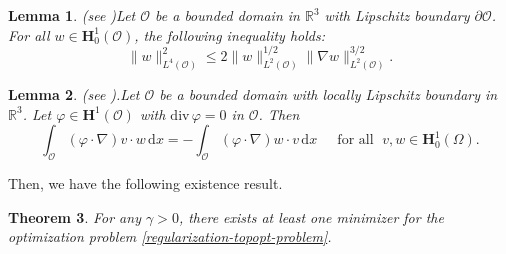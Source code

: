 \documentclass[a4paper,12pt,reqno,natbib]{amsart}
\newtheorem{theorem}{Theorem}
\newtheorem{lemma}[theorem]{Lemma}
\newcommand{\dx} {\displaystyle\mathrm{d}x}
\def\O{\mathcal O}
\def\H{\textbf{H}}
\begin{document}
\begin{lemma}(see \cite[Lemma 3.5, p. 237]{temam1973theory})\label{estimat-L-4} Let $\mathcal{O}$ be a bounded domain in \( \mathbb{R}^3 \) with Lipschitz boundary $\partial\O$. For all $w\in\H^1_0(\mathcal{O})$, the following inequality holds:
    \begin{equation*}
        \big\|w \big\|_{L^4(\mathcal{O})}^2\leq 2 \big\|w \big\|_{L^2(\mathcal{O})}^{1/2}\big\|\nabla w \big\|_{L^2(\mathcal{O})}^{3/2}.
    \end{equation*}
\end{lemma}

\begin{lemma} (see  \cite[ Lemma IX.2.1, p. 591]{galdi2011introduction}).\label{lem-NS-prelim20} Let \( \O \) be a bounded domain with locally Lipschitz boundary in \( \mathbb{R}^3 \). Let \( \varphi \in \H^1(\O) \) with \( \text{div} \, \varphi = 0 \) in \( \O \). Then 
    \begin{equation}
        \int_{\O} (\varphi\cdot \nabla)v \cdot w\, \dx = -\int_{\O} (\varphi\cdot \nabla)w \cdot v\, \dx\;\;\;\;\text{   for all  }\; v,w\in\H^1_0(\Omega).
    \end{equation}
\end{lemma}

Then, we have the following existence result.
\begin{theorem}\label{existence-optimal-solution}
For any $\gamma > 0$, there exists at least one minimizer for the optimization problem \eqref{regularization-topopt-problem}. \end{theorem}
\end{document}
